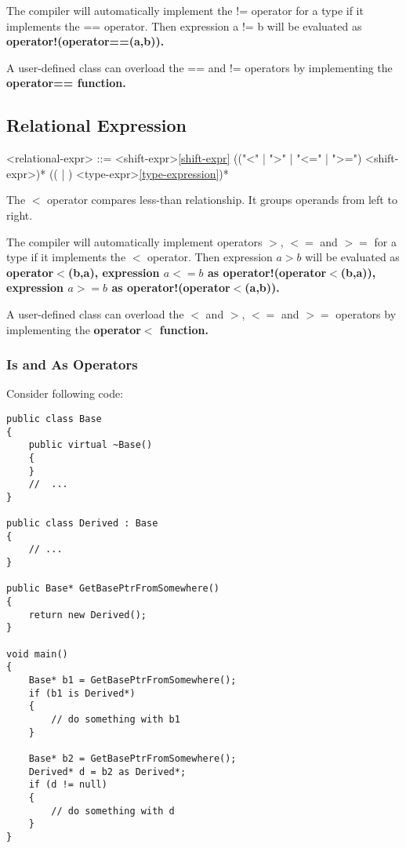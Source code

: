 \documentclass[a4paper,oneside,11pt]{article}
\begin{document}
The compiler will automatically implement the != operator for a type if it implements the == operator.
Then expression a != b will be evaluated as \bf{operator!(operator==(a,b))}.

A user-defined class can overload the == and != operators by implementing the \bf{operator==} function.

\subsection{Relational Expression}

\begin{grammar}
\label{relational-expr}<relational-expr> ::= <shift-expr>\ref{shift-expr} (("<" | ">" | "<=" | ">=") <shift-expr>)*
 (( | ) <type-expr>\ref{type-expression})*
\end{grammar}

The $<$ operator compares less-than relationship. It groups operands from left to right.

The compiler will automatically implement operators $>$, $<=$ and $>=$ for a type if it implements the $<$ operator.
Then expression $a > b$ will be evaluated as \bf{operator$<$(b,a)},
expression $a <= b$ as \bf{operator!(operator$<$(b,a))},
expression $a >= b$ as \bf{operator!(operator$<$(a,b))}.

A user-defined class can overload the $<$ and $>$, $<=$ and $>=$ operators by implementing the \bf{operator$<$} function.

\subsubsection{\bf{Is} and \bf{As} Operators}

Consider following code:

\begin{lstlisting}[frame=trBL]
public class Base
{
    public virtual ~Base()
    {
    }
    //  ...
}

public class Derived : Base
{
    // ...
}

public Base* GetBasePtrFromSomewhere()
{
    return new Derived();
}

void main()
{
    Base* b1 = GetBasePtrFromSomewhere();
    if (b1 is Derived*)
    {
        // do something with b1
    }

    Base* b2 = GetBasePtrFromSomewhere();
    Derived* d = b2 as Derived*;
    if (d != null)
    {
        // do something with d
    }
}

\end{lstlisting}
\end{document}
